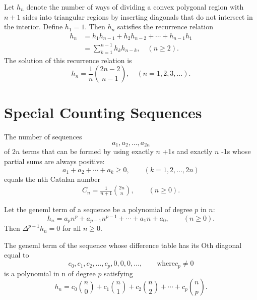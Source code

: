 \begin{theorem}
\label{thm:7.6.1}
Let $h_n$ denote the number of ways of dividing a convex polygonal region with $n+1$ sides into triangular regions by inserting diagonals that do not intersect in the interior. Define $h_1 = 1$. Then $h_n$ satisfies the recurrence relation
\begin{align}
h_n &= h_1 h_{n-1} + h_2 h_{n-2} + \cdots + h_{n-1} h_1
\\
&= \sum_{k=1}^{n-1} h_k h_{n-k}, \quad (n \geq 2). \tag{7.54}
\end{align}
The solution of this recurrence relation is
\[
h_n = \frac{1}{n} \binom{2n-2}{n-1}, \quad (n = 1, 2, 3, \dots).
\]
\end{theorem}

\chapter{Special Counting Sequences}

\begin{theorem}
  \label{thm:8.1.1}
  The number of sequences 
  \begin{equation}\label{8.1}
  a_1, a_2, \ldots, a_{2n}
  \end{equation}
  of $2n$ terms that can be formed by using exactly $n$ +1s and exactly $n$ -1s whose partial sums 
  are always positive:
  \begin{equation}\label{8.2}
  a_1 + a_2 + \cdots + a_{k} \geq 0, \qquad  (k = 1, 2, \ldots, 2n)
  \end{equation}
  equals the nth Catalan number
  \begin{align*}
  C_n = \frac{1}{n+1} \binom{2n}{n}, \qquad (n \geq 0).
  \end{align*}
\end{theorem}

\begin{theorem}
  \label{thm:8.2.1}
  Let the geneml term of a sequence be a polynomial of degree $p$ in $n$:
  \[ h_n = a_pn^p + a_{p-1}n^{p-1} + \cdots + a_1n + a_0, \qquad (n \geq 0). \]
  Then $\Delta^{p+1}h_n = 0$ for all $n \geq 0$.
\end{theorem}

\begin{theorem}
  \label{thm:8.2.2}
  The geneml term of the sequence whose difference table has its Oth diagonal equal to
  \[ c_0, c_1, c_2, \ldots, c_p, 0, 0, 0, \ldots, \qquad \text{where} c_p \neq 0  \]
  is a polynomial in n of degree $p$ satisfying
  \begin{equation}\label{8.12}
    h_n = c_0\binom{n}{0} + c_1\binom{n}{1} + c_2\binom{n}{2} + \cdots + c_p\binom{n}{p}.
  \end{equation}
\end{theorem}


